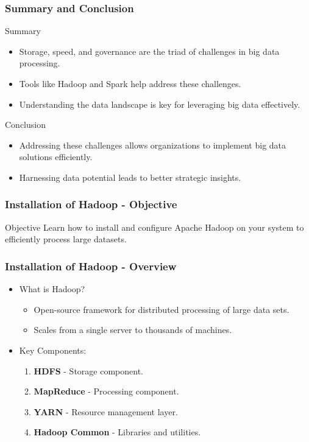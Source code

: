 \documentclass[aspectratio=169]{beamer}
\begin{document}
\begin{frame}[fragile]
    \frametitle{Summary and Conclusion}
    \begin{block}{Summary}
        \begin{itemize}
            \item Storage, speed, and governance are the triad of challenges in big data processing.
            \item Tools like Hadoop and Spark help address these challenges.
            \item Understanding the data landscape is key for leveraging big data effectively.
        \end{itemize}
    \end{block}
    
    \begin{block}{Conclusion}
        \begin{itemize}
            \item Addressing these challenges allows organizations to implement big data solutions efficiently.
            \item Harnessing data potential leads to better strategic insights.
        \end{itemize}
    \end{block}
\end{frame}

\begin{frame}[fragile]
    \frametitle{Installation of Hadoop - Objective}
    \begin{block}{Objective}
        Learn how to install and configure Apache Hadoop on your system to efficiently process large datasets.
    \end{block}
\end{frame}

\begin{frame}[fragile]
    \frametitle{Installation of Hadoop - Overview}
    \begin{itemize}
        \item What is Hadoop?
        \begin{itemize}
            \item Open-source framework for distributed processing of large data sets.
            \item Scales from a single server to thousands of machines.
        \end{itemize}
        \item Key Components:
        \begin{enumerate}
            \item \textbf{HDFS} - Storage component.
            \item \textbf{MapReduce} - Processing component.
            \item \textbf{YARN} - Resource management layer.
            \item \textbf{Hadoop Common} - Libraries and utilities.
        \end{enumerate}
    \end{itemize}
\end{frame}
\end{document}
